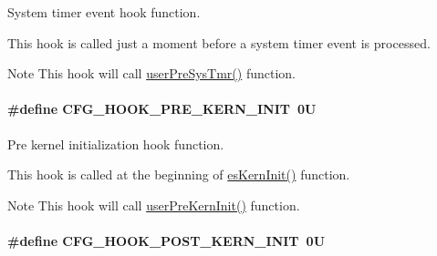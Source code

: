 System timer event hook function. 

This hook is called just a moment before a system timer event is processed. \begin{DoxyNote}{Note}
This hook will call \hyperlink{group__kern__intf_ga9a0d562969acef0121136b11be7b4728}{user\-Pre\-Sys\-Tmr()} function. 
\end{DoxyNote}
\hypertarget{group__template__kern__cfg_ga4093113f2105d2716f86c6509a6e643a}{
\paragraph[{C\-F\-G\-\_\-\-H\-O\-O\-K\-\_\-\-P\-R\-E\-\_\-\-K\-E\-R\-N\-\_\-\-I\-N\-I\-T}]{\setlength{\rightskip}{0pt plus 5cm}\#define C\-F\-G\-\_\-\-H\-O\-O\-K\-\_\-\-P\-R\-E\-\_\-\-K\-E\-R\-N\-\_\-\-I\-N\-I\-T~0\-U}}\label{group__template__kern__cfg_ga4093113f2105d2716f86c6509a6e643a}


Pre kernel initialization hook function. 

This hook is called at the beginning of \hyperlink{group__kern__intf_ga9e9ff699d62d6035cd51121bb3140704}{es\-Kern\-Init()} function. \begin{DoxyNote}{Note}
This hook will call \hyperlink{group__kern__intf_gaac77966856c9a299cda4794cbcc87edf}{user\-Pre\-Kern\-Init()} function. 
\end{DoxyNote}
\hypertarget{group__template__kern__cfg_ga85dea823714335c2ec9e9f7750996e83}{
\paragraph[{C\-F\-G\-\_\-\-H\-O\-O\-K\-\_\-\-P\-O\-S\-T\-\_\-\-K\-E\-R\-N\-\_\-\-I\-N\-I\-T}]{\setlength{\rightskip}{0pt plus 5cm}\#define C\-F\-G\-\_\-\-H\-O\-O\-K\-\_\-\-P\-O\-S\-T\-\_\-\-K\-E\-R\-N\-\_\-\-I\-N\-I\-T~0\-U}}\label{group__template__kern__cfg_ga85dea823714335c2ec9e9f7750996e83}


